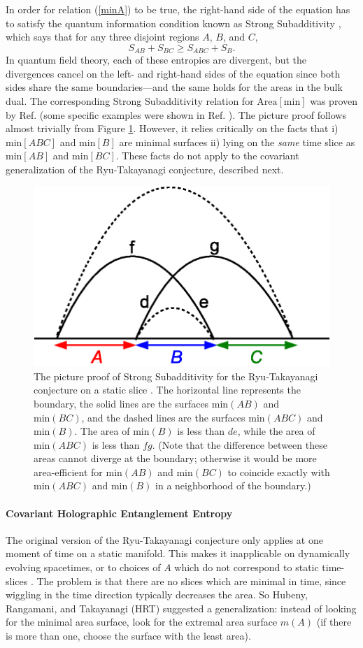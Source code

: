 \documentclass[12pt]{article}
\begin{document}
In order for relation (\ref{minA}) to be true, the right-hand side of the equation has to satisfy the quantum information condition known as Strong Subadditivity \cite{LR73}, which says that for any three disjoint regions $A$, $B$, and $C$,
\begin{equation}
S_{AB} + S_{BC} \ge S_{ABC} + S_{B}.
\end{equation}
In quantum field theory, each of these entropies are divergent, but the divergences cancel on the left- and right-hand sides of the equation since both sides share the same boundaries---and the same holds for the areas in the bulk dual.  The corresponding Strong Subadditivity relation for $\mathrm{Area}[\mathrm{min}]$ was proven by Ref. \cite{HT07} (some specific examples were shown in Ref. \cite{HiT07}).  The picture proof follows almost trivially from Figure \ref{SSAfig}.  However, it relies critically on the facts that i) $\mathrm{min}[ABC]$ and $\mathrm{min}[B]$ are minimal surfaces ii) lying on the \emph{same} time slice as $\mathrm{min}[AB]$ and $\mathrm{min}[BC]$.  These facts do not apply to the covariant generalization of the Ryu-Takayanagi conjecture, described next.
\begin{figure}[ht]
\centering
\includegraphics[width=.5\textwidth]{SSA2.eps}
\caption{\footnotesize The picture proof of Strong Subadditivity for the Ryu-Takayanagi conjecture on a static slice \cite{HT07}.  The horizontal line represents the boundary, the solid lines are the surfaces $\mathrm{min}(AB)$ and $\mathrm{min}(BC)$, and the dashed lines are the surfaces $\mathrm{min}(ABC)$ and $\mathrm{min}(B)$.  The area of $\mathrm{min}(B)$ is less than $de$, while the area of $\mathrm{min}(ABC)$ is less than $fg$.  (Note that the difference between these areas cannot diverge at the boundary; otherwise it would be more area-efficient for $\mathrm{min}(AB)$ and $\mathrm{min}(BC)$ to coincide exactly with $\mathrm{min}(ABC)$ and $\mathrm{min}(B)$ in a neighborhood of the boundary.)}\label{SSAfig}
\end{figure}
\paragraph{Covariant Holographic Entanglement Entropy} The original version of the Ryu-Takayanagi conjecture only applies at one moment of time on a static manifold.  This makes it inapplicable on dynamically evolving spacetimes, or to choices of $A$ which do not correspond to static time-slices \cite{CHH12}.  The problem is that there are no slices which are minimal in time, since wiggling in the time direction typically decreases the area.  So Hubeny, Rangamani, and Takayanagi (HRT) \cite{HRT07} suggested a generalization: instead of looking for the minimal area surface, look for the extremal area surface $m(A)$ (if there is more than one, choose the surface with the least area).   
\end{document}
